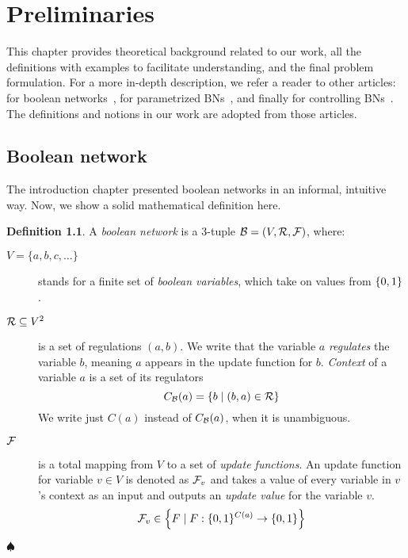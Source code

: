 \documentclass[
	digital, oneside, nosansbold, nocolorbold, nolot, nolof
]{fithesis4}
\theoremstyle{definition}
\newtheorem{definition}{Definition}
\theoremstyle{definition}
\newenvironment{ldefinition}
    {\begin{definition}}
	{\par\hspace{\stretch{1}}$\spadesuit$\hspace{\stretch{1}}
     \par\end{definition}}
\DeclarePairedDelimiter{\set}{\{}{\}}
\begin{document}
\chapter{Preliminaries}

This chapter provides theoretical background related to our work, all the
definitions with examples to facilitate understanding, and the final problem
formulation. For a more in-depth description, we refer a reader to other
articles: for boolean networks~\cite{concepts_bn}, for parametrized
BNs~\cite{kadlecaj_thesis}, and finally for controlling BNs~\cite{infl_max_BN}.
The definitions and notions in our work are adopted from those articles.

\section{Boolean network}

The introduction chapter presented boolean networks in an informal, intuitive
way. Now, we show a solid mathematical definition here.

\begin{ldefinition}
A \emph{boolean network} is a 3-tuple $\mathcal{B} = (V, \mathcal{R}, \mathcal{F})$,
where:
\begin{description}
\item[$V = \{a, b, c, \ldots \}$] stands for a finite set of
    \emph{boolean variables}, which take on values from $\set{0, 1}$.
\item[$\mathcal{R} \subseteq V^2$] is a set of regulations $(a, b)$. We write
    that the variable $a$ \emph{regulates} the variable $b$, meaning $a$
    appears in the update function for $b$. \emph{Context} of a variable
    $a$ is a set of its regulators
    \[C_{\BN{B}}(a) = \set{b \mid (b, a) \in \BNRs{R}}\]
    We write just $C(a)$ instead of $C_{\mathcal{B}}(a)$, when it is unambiguous.
\item[$\mathcal{F}$] is a total mapping from $V$ to a set of
    \emph{update functions}. An update function for variable $v \in V$ is
    denoted as $\mathcal{F}_v$ and takes a value of every variable in $v$'s
    context as an input and outputs an \emph{update value} for the variable
    $v$.
    \[
        \BNUFs{F}_v \in \set*{F \mid F: \set{0, 1}^{C(a)} \to \set{0, 1}}
    \]
\end{description}
\end{ldefinition}
\end{document}

